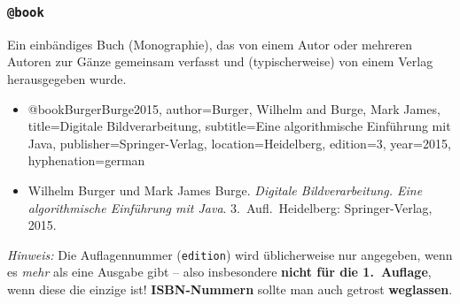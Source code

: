 \subsubsection{\texttt{@book}}
\label{sec:@book}
Ein einbändiges Buch (Monographie), das von einem Autor oder mehreren Autoren zur Gänze gemeinsam verfasst und (typischerweise) von einem Verlag herausgegeben wurde.
% 
\begin{itemize}
\item[] 
\begin{GenericCode}[numbers=none]
@book{BurgerBurge2015,
    author={Burger, Wilhelm and Burge, Mark James},
    title={Digitale Bildverarbeitung},
    subtitle={Eine algorithmische Einführung mit Java},
    publisher={Springer-Verlag},
    location={Heidelberg},
    edition={3},
    year={2015},
    hyphenation={german}
}
\end{GenericCode}
\item[\cite{BurgerBurge2015}]
Wilhelm Burger und Mark James Burge. \textit{Digitale Bildverarbeitung. Eine
algorithmische Einführung mit Java}. 3.\ Aufl.\ Heidelberg: Springer-Verlag,
2015.
\end{itemize}
%
\emph{Hinweis:} Die Auflagennummer (\texttt{edition}) wird üblicherweise nur angegeben, 
wenn es \emph{mehr} als eine Ausgabe gibt -- also insbesondere \textbf{nicht für die 1.\ Auflage}, 
wenn diese die einzige ist!
\textbf{ISBN-Nummern} sollte man auch getrost \textbf{weglassen}.



